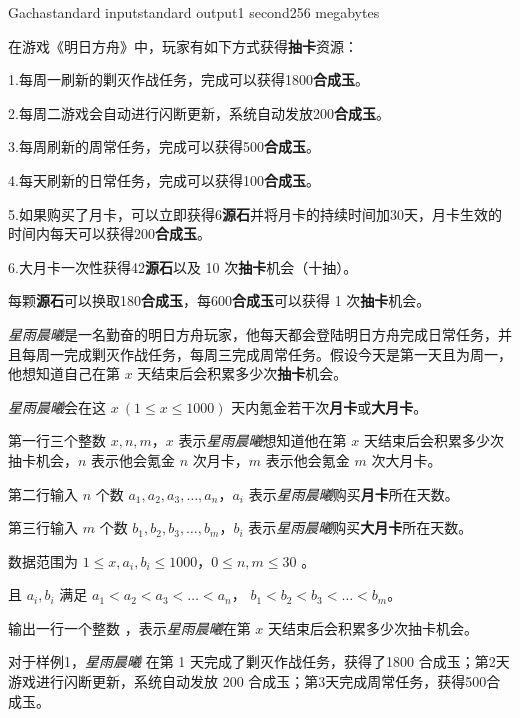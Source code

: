 \documentclass[12pt,a4paper,oneside]{article}
\begin{document}
    \begin{problem}{Gacha}{standard input}{standard output}{1 second}{256 megabytes}
	
	在游戏《明日方舟》中，玩家有如下方式获得\textbf{抽卡}资源：
 
        1.每周一刷新的剿灭作战任务，完成可以获得1800\textbf{合成玉}。
        
        2.每周二游戏会自动进行闪断更新，系统自动发放200\textbf{合成玉}。
        
        3.每周刷新的周常任务，完成可以获得500\textbf{合成玉}。
        
        4.每天刷新的日常任务，完成可以获得100\textbf{合成玉}。

        5.如果购买了月卡，可以立即获得6\textbf{源石}并将月卡的持续时间加30天，月卡生效的时间内每天可以获得200\textbf{合成玉}。
        
        6.大月卡一次性获得42\textbf{源石}以及 10 次\textbf{抽卡}机会（十抽）。

        每颗\textbf{源石}可以换取180\textbf{合成玉}，每600\textbf{合成玉}可以获得 1 次\textbf{抽卡}机会。

        \textit{星雨晨曦}是一名勤奋的明日方舟玩家，他每天都会登陆明日方舟完成日常任务，并且每周一完成剿灭作战任务，每周三完成周常任务。假设今天是第一天且为周一，他想知道自己在第 $x$ 天结束后会积累多少次\textbf{抽卡}机会。

        \textit{星雨晨曦}会在这 $x \ (1 \le x \le 1000)$ 天内氪金若干次\textbf{月卡}或\textbf{大月卡}。

	\InputFile
	第一行三个整数 $x,n,m$，$x$ 表示\textit{星雨晨曦}想知道他在第 $x$ 天结束后会积累多少次抽卡机会，$n$ 表示他会氪金 $n$ 次月卡，$m$ 表示他会氪金 $m$ 次大月卡。
 
        第二行输入 $n$ 个数 $a_1,a_2,a_3,\dots ,a_n$，$a_i$ 表示\textit{星雨晨曦}购买\textbf{月卡}所在天数。

        第三行输入 $m$ 个数 $b_1,b_2,b_3,\dots ,b_m$，$b_i$ 表示\textit{星雨晨曦}购买\textbf{大月卡}所在天数。

        数据范围为 $1 \le x,a_i,b_i \le 1000$，$0 \le n,m \le 30$ 。
        
        且 $a_i,b_i$ 满足 $a_1 < a_2 < a_3 < \dots < a_n$， $b_1 < b_2 < b_3 < \dots < b_m$。
	
	\OutputFile
	
	输出一行一个整数 ，表示\textit{星雨晨曦}在第 $x$ 天结束后会积累多少次抽卡机会。

	
	\Example
	
	\begin{example}
	\end{example}
    \Explanations
    对于样例1，\textit{星雨晨曦} 在第 1 天完成了剿灭作战任务，获得了1800 合成玉；第2天游戏进行闪断更新，系统自动发放 200 合成玉；第3天完成周常任务，获得500合成玉。
    

\end{problem}
\end{document}
